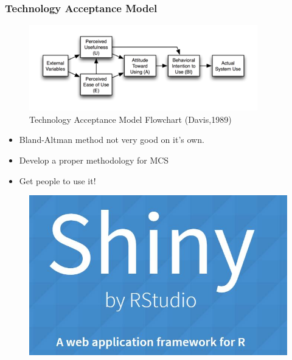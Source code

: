 \documentclass[compress]{beamer}        %
\begin{document}
\begin{frame}
	\frametitle{Technology Acceptance Model}

\begin{figure}
\centering
\includegraphics[width=0.79\linewidth]{TechAccept}
\caption{Technology Acceptance Model Flowchart (Davis,1989)}
\label{fig:TechAccept}
\end{figure}

\end{frame}

\begin{frame}
	\Large
	\begin{itemize}
		\item Bland-Altman method not very good on it's own.
		\item Develop a proper methodology for MCS
		
		\item Get people to use it!
	\end{itemize}
\end{frame}

\begin{frame}
	\begin{figure}
\centering
\includegraphics[width=0.99\linewidth]{SHINY}
\end{figure}

\end{frame}
\end{document}
